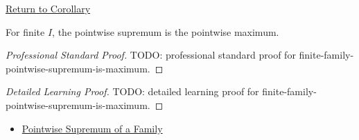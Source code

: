 \newpage
{}
\label{prf:finite-family-pointwise-supremum-is-maximum}

\begin{remark*}[Return]
\hyperref[cor:finite-family-pointwise-supremum-is-maximum]{Return to Corollary}
\end{remark*}

\begin{corollary*}
For finite \(I\), the pointwise supremum is the pointwise maximum.
\end{corollary*}

\begin{proof}[Professional Standard Proof]
\LRAProofBodyStart
TODO: professional standard proof for finite-family-pointwise-supremum-is-maximum.
\end{proof}

\begin{proof}[Detailed Learning Proof]
\LRAProofBodyStart
TODO: detailed learning proof for finite-family-pointwise-supremum-is-maximum.
\end{proof}

\begin{remark*}
\end{remark*}

\begin{dependencies}
\begin{itemize}
  \item \hyperref[def:pointwise-supremum-family]{Pointwise Supremum of a Family}
\end{itemize}
\end{dependencies}

\clearpage

